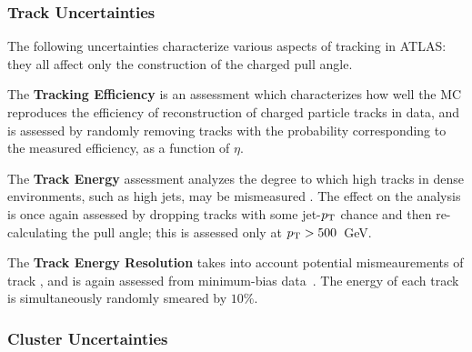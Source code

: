 	\subsubsection{Track Uncertainties}

	The following uncertainties characterize various aspects of tracking in ATLAS: they all affect only the construction of the charged pull angle.

	The \textbf{Tracking Efficiency} is an assessment which characterizes how well the MC reproduces the efficiency of reconstruction of charged particle tracks in data, and is assessed by randomly removing tracks with the probability corresponding to the measured efficiency, as a function of $\eta$.  %


	The \textbf{Track Energy} assessment analyzes the degree to which high \pt tracks in dense environments, such as high \pt jets, may be mismeasured . The effect on the analysis is once again assessed by dropping tracks with some jet-$p_{\text{T}}$ chance and then re-calculating the pull angle; this is assessed only at $p_{\text{T}} > 500$~GeV.%

	The \textbf{Track Energy Resolution} takes into account potential mismeaurements of track \pt, and is again assessed from minimum-bias data~. The energy of each track is simultaneously randomly smeared by $10\%$. 

	\subsubsection{Cluster Uncertainties}

